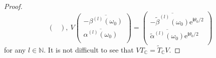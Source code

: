 \documentclass[10pt,a4paper]{amsart}
\begin{document}
\begin{proof}
$$\begin{pmatrix}
    \end{pmatrix},\
    V
    \begin{pmatrix}
    -\overline{\beta^{(l)}(\omega_0)} \\
    \overline{\alpha^{(l)}(\omega_0)} \\
    \end{pmatrix}
    =\begin{pmatrix}
    -\overline{\widetilde{\beta}^{(l)}(\omega_0)}\mathrm{e}^{\boldsymbol{i}\theta_0/2} \\
    \overline{\widetilde{\alpha}^{(l)}(\omega_0)}\mathrm{e}^{\boldsymbol{i}\theta_0/2} \\
    \end{pmatrix}
    $$
    for any $l\in\mathbb{N}$. It is not difficult to see that $VT_{\mathbb{C}}=\widetilde{T}_{\mathbb{C}}V$.


\end{proof}
\end{document}
